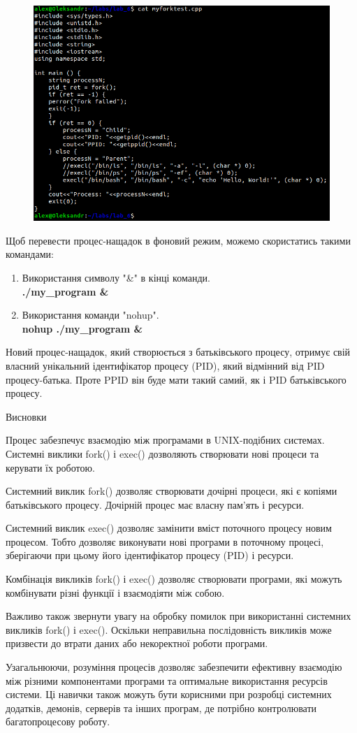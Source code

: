 \documentclass[a4paper,12pt]{article}
\begin{document}
    \begin{figure}[h!]
        \begin{minipage}[h]{1\linewidth}
            \centering
            \includegraphics[width=0.5\linewidth]{Prt sc/Figure_8_3.png}  
        \end{minipage}
    \end{figure}

\newpage
    Щоб перевести процес-нащадок в фоновий режим, можемо скористатись такими командами:
    \begin{enumerate}
        \item Використання символу "\&" в кінці команди. \\
        \textbf{./my\_program \&}
        \item Використання команди "nohup". \\
        \textbf{nohup ./my\_program \&}
    \end{enumerate}

    Новий процес-нащадок, який створюється з батьківського процесу, отримує свій власний унікальний ідентифікатор процесу (PID), 
    який відмінний від PID процесу-батька. Проте PPID він буде мати такий самий, як і PID батьківського процесу.
    \begin{center}
        \Large{Висновки}
    \end{center}

    Процес забезпечує взаємодію між програмами в UNIX-подібних системах. Системні виклики fork() і exec() дозволяють створювати нові процеси та керувати їх роботою.

    Системний виклик fork() дозволяє створювати дочірні процеси, які є копіями батьківського процесу. Дочірній процес має власну пам'ять і ресурси.

    Системний виклик exec() дозволяє замінити вміст поточного процесу новим процесом. Тобто дозволяє виконувати нові програми в поточному процесі, зберігаючи при цьому його ідентифікатор процесу (PID) і ресурси.

    Комбінація викликів fork() і exec() дозволяє створювати програми, які можуть комбінувати різні функції і взаємодіяти між собою.

    Важливо також звернути увагу на обробку помилок при використанні системних викликів fork() і exec().
    Оскільки неправильна послідовність викликів може призвести до втрати даних або некоректної роботи програми.
    
    Узагальнюючи, розуміння процесів дозволяє забезпечити ефективну взаємодію між різними компонентами програми та оптимальне використання ресурсів системи. 
    Ці навички також можуть бути корисними при розробці системних додатків, демонів, серверів та інших програм, де потрібно контролювати багатопроцесову роботу.
\end{document}
